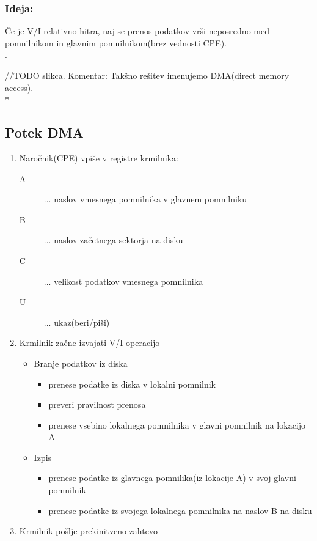 \documentclass[
  slovene,
  a4paper
]{book}
\begin{document}
\subsubsection{Ideja:} 
Če je V/I relativno hitra, naj se prenos podatkov vrši neposredno med pomnilnikom in glavnim pomnilnikom(brez vednosti CPE).\\.

//TODO slikca. Komentar: Takšno rešitev imenujemo DMA(direct memory access).\\*

\subsection{Potek DMA}

\begin{enumerate}
  \item Naročnik(CPE) vpiše v registre krmilnika:
    \begin{description}
      \item[A] ... naslov vmesnega pomnilnika v glavnem pomnilniku
      \item[B] ... naslov začetnega sektorja na disku
      \item[C] ... velikost podatkov vmesnega pomnilnika
      \item[U] ... ukaz(beri/piši)
    \end{description}
  \item Krmilnik začne izvajati V/I operacijo
    \begin{itemize}
      \item Branje podatkov iz diska
        \begin{itemize}
          \item prenese podatke iz diska v lokalni pomnilnik
          \item preveri pravilnost prenosa
          \item prenese vsebino lokalnega pomnilnika v glavni pomnilnik na lokacijo A
        \end{itemize}
      \item Izpis
        \begin{itemize}
          \item prenese podatke iz glavnega pomnilika(iz lokacije A) v svoj glavni pomnilnik
          \item prenese podatke iz svojega lokalnega pomnilnika na naslov B na disku
        \end{itemize}
    \end{itemize}
  \item Krmilnik pošlje prekinitveno zahtevo
\end{enumerate}
\end{document}
